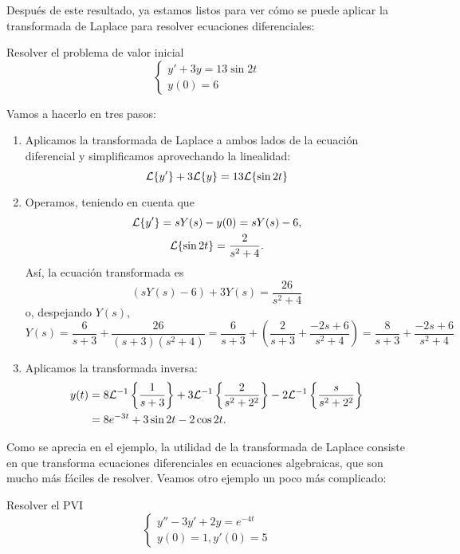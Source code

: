 \documentclass[../ecuaciones_diferenciales.tex]{subfiles}
\begin{document}
Después de este resultado, ya estamos listos para ver cómo se puede aplicar la
transformada de Laplace para resolver ecuaciones diferenciales:

\begin{example}
	Resolver el problema de valor inicial
	\[
		\begin{cases}
			y' + 3y = 13 \sin 2t \\
			y(0) = 6
		\end{cases}
	\]
\end{example}

\begin{solution}
	Vamos a hacerlo en tres pasos:
	\begin{enumerate}[1)]
		\item Aplicamos la transformada de Laplace a ambos lados de la ecuación
		      diferencial y simplificamos aprovechando la linealidad:
		      \[\mathcal{L}\{y'\} + 3\mathcal{L}\{y\} = 13\mathcal{L}\{\sin 2t\}\]
		\item Operamos, teniendo en cuenta que
		      \begin{gather*}
			      \mathcal{L}\{y'\} = sY(s) - y(0) = sY(s) -  6, \\
			      \mathcal{L}\{\sin 2t\} = \frac{2}{s^2+4}.
		      \end{gather*}
		      Así, la ecuación transformada es
		      \[(sY(s) - 6) + 3Y(s) = \frac{26}{s^2+4}\]
		      o, despejando \(Y(s)\),
		      \[
			      Y(s) = \frac{6}{s+3} + \frac{26}{(s+3)(s^2+4)} = \frac{6}{s+3} + \left(
			      \frac{2}{s+3} + \frac{-2s+6}{s^2+4} \right) = \frac{8}{s+3} + \frac{-2s+6}{s^2+4}
		      \]
		\item Aplicamos la transformada inversa:
		      \begin{align*}
			      y(t) & = 8 \mathcal{L}^{-1}\left\{\frac{1}{s+3}\right\} + 3
			      \mathcal{L}^{-1}\left\{\frac{2}{s^2+2^2}\right\} -2
			      \mathcal{L}^{-1}\left\{\frac{s}{s^2+2^2}\right\}            \\
			           & = 8e^{-3t} + 3\sin 2t - 2\cos 2t.
		      \end{align*}
	\end{enumerate}
\end{solution}

Como se aprecia en el ejemplo, la utilidad de la transformada de Laplace consiste
en que transforma ecuaciones diferenciales en ecuaciones algebraicas, que son
mucho más fáciles de resolver. Veamos otro ejemplo un poco más complicado:

\begin{example}
	Resolver el PVI
	\[
		\begin{cases}
			y'' - 3y' + 2y = e^{-4t} \\
			y(0) = 1, y'(0) = 5
		\end{cases}
	\]
\end{example}
\end{document}
